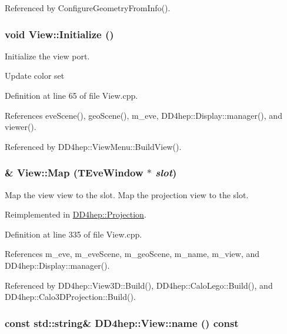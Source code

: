 Referenced by ConfigureGeometryFromInfo().\hypertarget{class_d_d4hep_1_1_view_a7a968707a03a2fb140df5f4264708a20}{
\subsubsection[{Initialize}]{\setlength{\rightskip}{0pt plus 5cm}void View::Initialize ()}}
\label{class_d_d4hep_1_1_view_a7a968707a03a2fb140df5f4264708a20}


Initialize the view port. 

Update color set 

Definition at line 65 of file View.cpp.

References eveScene(), geoScene(), m\_\-eve, DD4hep::Display::manager(), and viewer().

Referenced by DD4hep::ViewMenu::BuildView().\hypertarget{class_d_d4hep_1_1_view_a570467ad2be3126bca9aa3563338bcd2}{
\subsubsection[{Map}]{ \& View::Map (TEveWindow $\ast$ {\em slot})}}
\label{class_d_d4hep_1_1_view_a570467ad2be3126bca9aa3563338bcd2}


Map the view view to the slot. Map the projection view to the slot. 

Reimplemented in \hyperlink{class_d_d4hep_1_1_projection_a68380e96afb21b0c4fd52e986032df80}{DD4hep::Projection}.

Definition at line 335 of file View.cpp.

References m\_\-eve, m\_\-eveScene, m\_\-geoScene, m\_\-name, m\_\-view, and DD4hep::Display::manager().

Referenced by DD4hep::View3D::Build(), DD4hep::CaloLego::Build(), and DD4hep::Calo3DProjection::Build().\hypertarget{class_d_d4hep_1_1_view_ae5195f3caf77a0e4a7f750a3d69a9089}{
\subsubsection[{name}]{\setlength{\rightskip}{0pt plus 5cm}const std::string\& DD4hep::View::name () const}}
\label{class_d_d4hep_1_1_view_ae5195f3caf77a0e4a7f750a3d69a9089}


